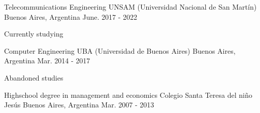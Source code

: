 

\begin{cventries}

  \cventry
    {Telecommunications Engineering} %
    {UNSAM (Universidad Nacional de San Martín)} %
    {Buenos Aires, Argentina} %
    {June. 2017 - 2022} %
    {
      \begin{cvitems} %
        \item {Currently studying}
      \end{cvitems}
    }

  \cventry
  {Computer Engineering} %
  {UBA (Universidad de Buenos Aires)} %
  {Buenos Aires, Argentina} %
  {Mar. 2014 - 2017} %
  {
  \begin{cvitems} %
    \item {Abandoned studies}
  \end{cvitems}
  }

  \cventry
  {Highschool degree in management and economics} %
  {Colegio Santa Teresa del niño Jesús} %
  {Buenos Aires, Argentina} %
  {Mar. 2007 - 2013} %
  {
  \begin{cvitems} %
  \end{cvitems}
  }
\end{cventries}
